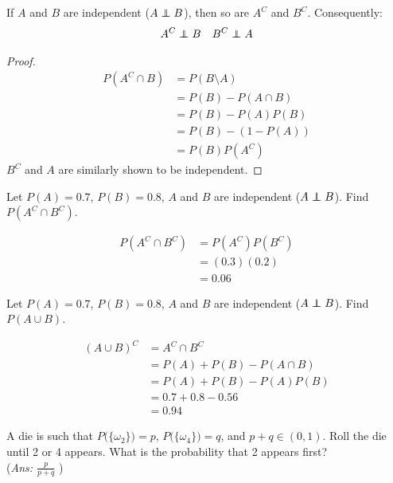 \documentclass{article}
\begin{document}
 \begin{thm}
 	If $A$ and $B$ are independent ($A \indp B$), then so are $A^C$ and $B^C$. Consequently:
 	\begin{align*}
 		A^C \indp B && B^C \indp A
 	\end{align*}
 \end{thm}
	\begin{proof}
		\begin{align*}
			P(A^C \cap B ) &= P (B \setminus A) \\
			&= P(B) - P(A \cap B) \\
			&= P(B) -P(A)P(B) \\
			&= P(B) - (1- P(A)) \\
			&= P(B) P(A^C)
		\end{align*}
		$B^C$ and $A$ are similarly shown to be independent.
	\end{proof}
	\hfill
	\begin{exmp}
		Let $P(A) = 0.7$, $P(B)=0.8$, $A$ and $B$ are independent ($A \indp B$). Find $P(A^C \cap B^C)$.
	\pagebreak
		\begin{sol}
			$ $
			\begin{align*}
				P(A^C\cap B^C) &= P(A^C)P(B^C)\\
				&= (0.3)(0.2)\\
				&\boxed{= 0.06}
			\end{align*}
		\end{sol}
	\end{exmp}
	\begin{exmp}
		Let $P(A) = 0.7$, $P(B)=0.8$, $A$ and $B$ are independent ($A\indp B$). Find $P(A \cup B)$.
		\begin{sol}
			\begin{align*}
				(A \cup B)^C &= A^C \cap B^C \\
				&= P(A) + P(B) - P(A \cap B) \\
				&= P(A) + P(B) - P(A)P(B)\\
				&= 0.7 + 0.8 - 0.56 \\
				&\boxed{=0.94}
			\end{align*}
		\end{sol}
	\end{exmp}
 	\begin{exe}
 		A die is such that $P\big( \{ \omega_2 \} \big) = p$, $P\big( \{\omega_4\} \big) = q$, and $p+q \in (0, 1)$. Roll the die until 2 or 4 appears. What is the probability that 2 appears first?\\
 		(\emph{Ans: $\frac{p}{p+q}$} )
 	\end{exe}
\end{document}
